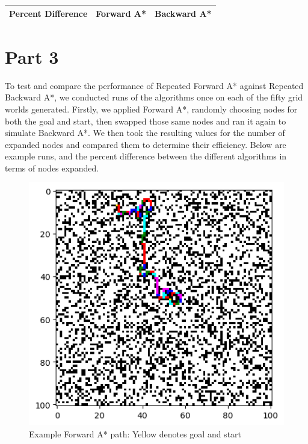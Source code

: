 \documentclass{article}
\begin{document}
\begin{center}
	\begin{tabular}{|c|c|c|}
		\hline
		Percent Difference & Forward A* & Backward A* \\
		\hline
		
		\hline
	\end{tabular}
\end{center}
\section{Part 3}
To test and compare the performance of Repeated Forward A* against Repeated Backward A*, we conducted runs of the algorithms once on each of the fifty grid worlds generated. Firstly, we applied Forward A*, randomly choosing nodes for both the goal and start, then swapped those same nodes and ran it again to simulate Backward A*. We then took the resulting values for the number of expanded nodes and compared them to determine their efficiency. Below are example runs, and the percent difference between the different algorithms in terms of nodes expanded.
\begin{figure}
	\caption{Example Forward A* path: Yellow denotes goal and start}
	\centering
	\includegraphics[scale=0.75]{visF}
\end{figure}
\end{document}
